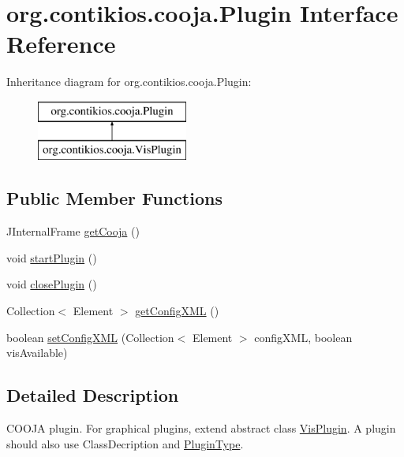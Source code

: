 \hypertarget{interfaceorg_1_1contikios_1_1cooja_1_1Plugin}{\section{org.\-contikios.\-cooja.\-Plugin Interface Reference}
\label{interfaceorg_1_1contikios_1_1cooja_1_1Plugin}
}
Inheritance diagram for org.\-contikios.\-cooja.\-Plugin\-:\begin{figure}[H]
\begin{center}
\leavevmode
\includegraphics[height=2.000000cm]{interfaceorg_1_1contikios_1_1cooja_1_1Plugin}
\end{center}
\end{figure}
\subsection*{Public Member Functions}
\begin{DoxyCompactItemize}
\item 
J\-Internal\-Frame \hyperlink{interfaceorg_1_1contikios_1_1cooja_1_1Plugin_ae19ca3da5d492cfc80836f304f71b32a}{get\-Cooja} ()
\item 
void \hyperlink{interfaceorg_1_1contikios_1_1cooja_1_1Plugin_aae8a585e3a659cc585859a5728a42d15}{start\-Plugin} ()
\item 
void \hyperlink{interfaceorg_1_1contikios_1_1cooja_1_1Plugin_a87f92ae1a613ed6f3665a953ab748430}{close\-Plugin} ()
\item 
Collection$<$ Element $>$ \hyperlink{interfaceorg_1_1contikios_1_1cooja_1_1Plugin_acf14af975741b1de50749b358cd671a7}{get\-Config\-X\-M\-L} ()
\item 
boolean \hyperlink{interfaceorg_1_1contikios_1_1cooja_1_1Plugin_a1a7b2031b097da13170429ce7f9dc39e}{set\-Config\-X\-M\-L} (Collection$<$ Element $>$ config\-X\-M\-L, boolean vis\-Available)
\end{DoxyCompactItemize}


\subsection{Detailed Description}
C\-O\-O\-J\-A plugin. For graphical plugins, extend abstract class \hyperlink{classorg_1_1contikios_1_1cooja_1_1VisPlugin}{Vis\-Plugin}. A plugin should also use Class\-Decription and \hyperlink{interfaceorg_1_1contikios_1_1cooja_1_1PluginType}{Plugin\-Type}.

